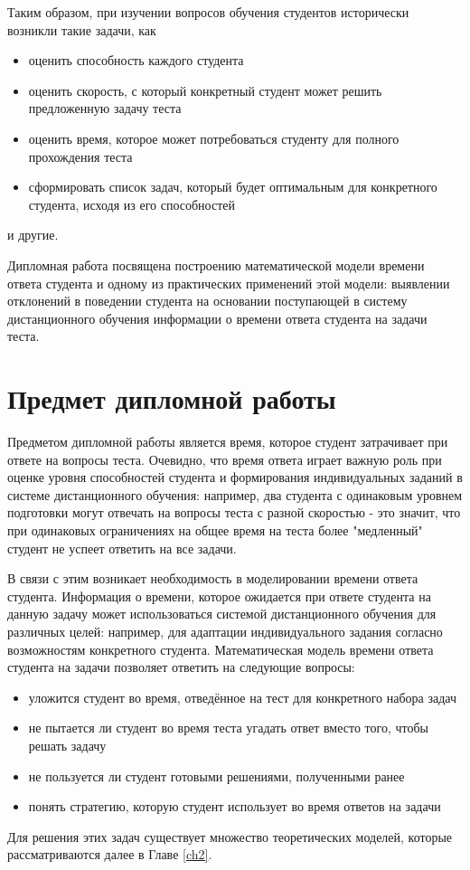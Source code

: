 Таким образом, при изучении вопросов обучения студентов исторически возникли такие задачи, как
\begin{itemize}
\item оценить способность каждого студента
\item оценить скорость, с который конкретный студент может решить пред\-ложенную задачу теста
\item оценить время, которое может потребоваться студенту для полного про\-хождения теста
\item сформировать список задач, который будет оптимальным для конкрет\-ного студента, исходя из его способностей
\end{itemize}
и другие.

Дипломная работа посвящена построению математической модели времени ответа студента и одному из практических применений этой модели: выявлении отклонений в поведении студента на основании поступающей в систему дистан\-ционного обучения информации о времени ответа студента на задачи теста.

\section{Предмет дипломной работы}

Предметом дипломной работы является время, которое студент затрачи\-вает при ответе на вопросы теста. Очевидно, что время ответа играет важную роль при оценке уровня способностей студента и формирования индивидуаль\-ных заданий в системе дистанционного обучения: например, два студента с одина\-ковым уровнем подготовки  могут отвечать на вопросы теста с разной скоростью - это значит, что при одинаковых ограничениях на общее время на теста более "медленный" студент не успеет ответить на все задачи.

В связи с этим возникает необходимость в моделировании времени ответа студента. Информация о времени, которое ожидается при ответе студента на данную задачу может использоваться системой дистанционного обучения для различных целей: например, для адап\-тации индивидуального задания согласно возможностям конкретного студента. Матема\-тическая модель времени ответа студента на задачи позволяет ответить на следующие вопросы:
\begin{itemize}
\item уложится студент во время, отведённое на тест для конкретного набора задач
\item не пытается ли студент во время теста угадать ответ вместо того, чтобы решать задачу
\item не пользуется ли студент готовыми решениями, полученными ранее
\item понять стратегию, которую студент использует  во время ответов на задачи
\end{itemize}

Для решения этих задач существует множество теоретических моделей, которые\\ рассматриваются далее в Главе \ref{ch2}.
